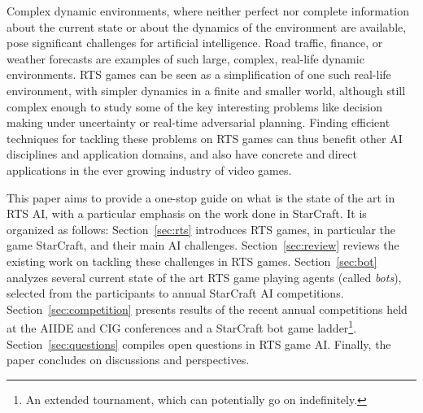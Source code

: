 \documentclass[journal]{IEEEtran}
\begin{document}
Complex dynamic environments, where neither perfect nor complete information about the current state or about the dynamics of the environment are available, pose significant challenges for artificial intelligence. Road  traffic, finance, or
weather  forecasts are  examples of such large, complex, real-life dynamic
environments. RTS games can be seen as a simplification of one such real-life
environment, with simpler dynamics in a  finite and smaller
world, although still complex enough  to study some of the key interesting
problems like decision making  under
uncertainty  or  real-time adversarial planning. Finding efficient  techniques for
tackling  these problems  on  RTS  games can  thus  benefit other AI disciplines and application
domains, and also have concrete  and direct applications in  the ever growing
industry of  video games.%

This paper aims to provide a one-stop guide on what is the state of
the art in RTS AI, with a particular emphasis on the work done in StarCraft. 
It is organized as follows: Section~\ref{sec:rts}
introduces RTS games, in particular the game StarCraft,
and  their main  AI challenges.  Section~\ref{sec:review}
reviews  the existing  work on tackling these challenges in RTS games.
Section~\ref{sec:bot} analyzes several current state of the art RTS game playing agents (called {\em bots}), selected from the participants to annual
StarCraft    AI    competitions.
Section~\ref{sec:competition}  presents results of the recent annual competitions
held at the AIIDE  and CIG conferences and a StarCraft bot game ladder\footnote{An extended tournament, which can potentially go on indefinitely.}.  Section~\ref{sec:questions}
compiles open questions in RTS game AI. Finally, the paper concludes on discussions and perspectives.


\end{document}
